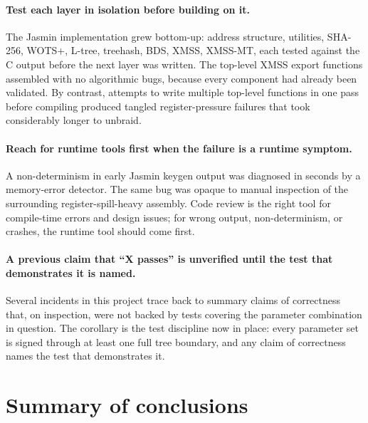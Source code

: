 \documentclass[11pt,a4paper]{article}
\begin{document}
\paragraph{Test each layer in isolation before building on it.}
The Jasmin implementation grew bottom-up: address structure,
utilities, SHA-256, WOTS+, L-tree, treehash, BDS, XMSS, XMSS-MT,
each tested against the C output before the next layer was written.
The top-level XMSS export functions assembled with no
algorithmic bugs, because every component had already been
validated. By contrast, attempts to write multiple top-level
functions in one pass before compiling produced tangled
register-pressure failures that took considerably longer to unbraid.

\paragraph{Reach for runtime tools first when the failure is a
runtime symptom.}
A non-determinism in early Jasmin keygen output was diagnosed in
seconds by a memory-error detector. The same bug was opaque to
manual inspection of the surrounding register-spill-heavy assembly.
Code review is the right tool for compile-time errors and design
issues; for wrong output, non-determinism, or crashes, the runtime
tool should come first.

\paragraph{A previous claim that ``X passes'' is unverified until
the test that demonstrates it is named.}
Several incidents in this project trace back to summary claims of
correctness that, on inspection, were not backed by tests covering
the parameter combination in question. The corollary is the test
discipline now in place: every parameter set is signed through at
least one full tree boundary, and any claim of correctness names the
test that demonstrates it.

\section{Summary of conclusions}
\end{document}
